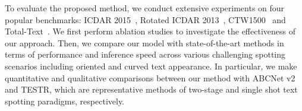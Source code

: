 To evaluate the proposed method, we conduct extensive experiments on four popular benchmarks: ICDAR 2015~\cite{karatzas2015icdar}, Rotated ICDAR 2013~\cite{karatzas2013icdar}, CTW1500~\cite{liu2019curved} and Total-Text~\cite{ch2017total}. We first perform ablation studies to investigate the effectiveness of our approach. Then, we compare our model with state-of-the-art methods in terms of performance and inference speed across various challenging spotting scenarios including oriented and curved text appearance. In particular, we make quantitative and qualitative comparisons between our method with ABCNet v2 and TESTR, which are representative methods of two-stage and single shot text spotting paradigms, respectively. 


\begin{comment}
\begin{table*}[!t]
\renewcommand{\arraystretch}{1.1}
  \caption{Comparison between \textbf{SRSTS} and \textbf{SRSTS v2} by Ablation study on CTW1500 and Total-Text. `Sampling-based': the text detection is performed based on the sampled points by the sampling module in \textbf{SRSTS v2}. `DTE': the deformable transformer encoder is employed in Feature Extractor. `SA': self-attention operation is used in Recognition Head of \textbf{SRSTS v2} to capture the long-range dependencies among sampled points. `P’, `R’, `F’ represent `Precision', `Recall' and `F-measure' respectively. `None' and `Full' are two metrics for measuring the end-to-end performance in terms of F-measure. `None’ represents the performance without using lexicon while ‘Full’ corresponds the performance using the lexicon containing all words appearing in the test set.}
  \label{tab:ablative}
  \centering
\begin{tabular}{l|ccc|ccccc|cccccc}
    \toprule
\multirow{3}{*}{Method} & \multicolumn{3}{c|}{\multirow{2}{*}{Model Components}} &\multicolumn{5}{c|}{CTW1500} & \multicolumn{6}{c}{Total-Text}\\
    \cmidrule(lr){5-9}
    \cmidrule(lr){10-15}
& & & &\multicolumn{3}{c}{Detection} & \multicolumn{2}{c|}{E2E}&\multicolumn{3}{c}{Detection} & \multicolumn{2}{c}{E2E}  &\multirow{2}*{FPS }\\
    \cmidrule(lr){2-4}
    \cmidrule(lr){5-7}
    \cmidrule(lr){8-9}
    \cmidrule(lr){10-12}
    \cmidrule(lr){13-14}
&Sampling-based & DTE & SA& P&R&F& None &Full& P&R&F& None &Full& \\
\midrule
SRSTS~\cite{wu2022decoupling} & & &  & 88.92&83.30 &86.02 &55.59 &78.06 &91.99 & 82.96 &87.24&78.80& 86.33&18.74  \\
    \midrule
SRSTS-sampling  &  & & & 91.38 & 84.04&87.56& 56.98 & 82.29 & 92.13  &83.97 &87.86&79.75&87.05 & \textbf{20.22}  \\
    SRSTS-DTE  &     &  & &\textbf{91.70}&84.23&87.80&59.57&82.88 &92.42 &86.52 & 89.37 &81.37 & 87.29& 13.44  \\
    \midrule 
\textbf{SRSTS v2}  &    &  &   &90.53 & \textbf{86.46}& \textbf{88.45}&\textbf{61.24} & \textbf{83.54 }&\textbf{93.30}& \textbf{86.74}&
\textbf{89.90} &\textbf{82.05}& \textbf{88.05}&12.86 \\
\bottomrule
  \end{tabular}
\end{table*}
\end{comment}
